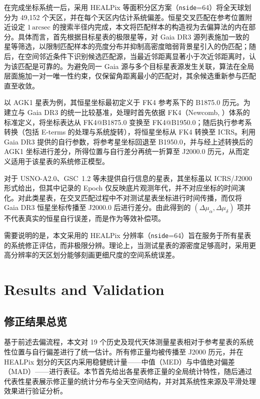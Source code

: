 \documentclass{aastex701}
\begin{document}
在完成坐标系统一后，采用 HEALPix 等面积分区方案（\texttt{nside}=64）将全天球划分为 49,152 个天区，并在每个天区内估计系统偏差。恒星交叉匹配在参考位置附近设定 $1\,\mathrm{arcsec}$ 的搜索半径内完成，本文将匹配样本的构造视为去偏算法的内在部分。具体而言，首先根据目标星表的极限星等，对 Gaia DR3 源列表施加一致的星等筛选，以限制匹配样本的亮度分布并抑制高密度暗弱背景星引入的伪匹配；随后，在空间邻近条件下识别候选匹配源，当最近邻距离显著小于次近邻距离时，认为该匹配是可靠的。为避免同一 Gaia 源与多个目标星表源发生关联，算法在全局层面施加一对一唯一性约束，仅保留角距离最小的匹配对，其余候选重新参与匹配直至收敛。

以 AGK1 星表为例，其恒星坐标最初定义于 FK4 参考系下的 B1875.0 历元。为建立与 Gaia DR3 的统一比较基准，处理时首先依据 FK4（Newcomb, \citet{Meeus1998} ）体系的标准定义，将坐标表达从 FK4@B1875.0 变换至 FK4@B1950.0；随后执行参考系转换（包括 E-terms 的处理与系统旋转），将恒星坐标从 FK4 转换至 ICRS。利用 Gaia DR3 提供的自行参数，将参考星坐标回退至 B1950.0，并与经上述转换后的 AGK1 坐标进行差分，所得位置与自行差分再统一折算至 J2000.0 历元，从而定义适用于该星表的系统修正模型。

对于 USNO-A2.0、GSC~1.2 等未提供自行信息的星表，其坐标虽以 ICRS/J2000 形式给出，但其中记录的 Epoch 仅反映底片观测年代，并不对应坐标的时间演化。对此类星表，在交叉匹配过程中不对测试星表坐标进行时间传播，而仅将 Gaia DR3 恒星坐标传播至 J2000.0 后进行差分。由此得到的 $(\Delta\mu_{\alpha}, \Delta\mu_{\delta})$ 项并不代表真实的恒星自行误差，而是作为等效补偿项。

需要说明的是，本文采用的 HEALPix 分辨率（\texttt{nside}=64）旨在服务于所有星表的系统修正评估，而非极限分辨。理论上，当测试星表的源密度足够高时，采用更高分辨率的天区划分能够刻画更细尺度的空间系统误差。

\section{Results and Validation} \label{sec:results}
\subsection{修正结果总览} \label{subsec:global_corrections}

基于前述去偏流程，本文对 19 个历史及现代天体测量星表相对于参考星表的系统性位置与自行偏差进行了统一估计。所有修正量均被传播至 J2000 历元，并在 HEALPix 划分的天区内采用稳健统计量——中值（MED）与中值绝对偏差（MAD）——进行表征。本节首先给出各星表修正量的全局统计特性，随后通过代表性星表展示修正量的统计分布与全天空间结构，并对其系统性来源及平滑处理效果进行验证分析。
\end{document}
